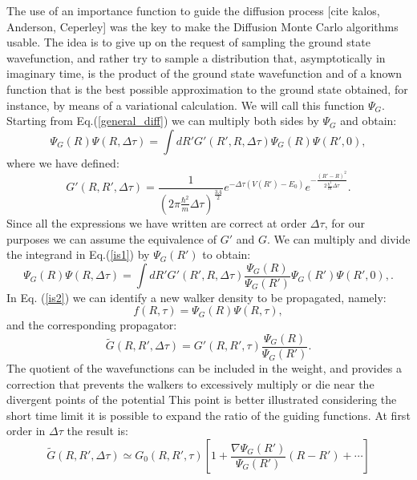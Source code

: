 The use of an importance function to guide the diffusion process [cite kalos, Anderson, Ceperley] was the key to make the Diffusion Monte Carlo algorithms usable. The idea is to give up on the request of sampling the ground state wavefunction, and rather try to sample a distribution that, asymptotically in imaginary time, is the product of the ground state wavefunction and of a known function that is the best possible approximation to the ground state obtained, for instance, by means of a variational calculation. We will call this function $\Psi_G$. Starting from Eq.(\ref{general_diff}) we can multiply both sides by $\Psi_G$ and obtain:
	\begin{equation}
	\Psi_G(R)\Psi(R,\Delta\tau)=\int dR' G'(R',R,\Delta\tau) \Psi_G(R)\Psi(R',0),\label{is1}
	\end{equation}
where we have defined:
\begin{equation}
G'(R,R',\Delta\tau)=\frac{1}{(2\pi\frac{\hbar^2}{m}\Delta\tau)^\frac{3A}{2}}e^{-\Delta\tau(V(R')-E_0)} e^{-\frac{(R'-R)^2}{2\frac{\hbar^2}{m}\Delta\tau}}.
\end{equation}
Since all the expressions we have written are correct at order $\Delta\tau$, for our purposes we can assume the equivalence of $G'$ and $G$. 
We can multiply and divide the  integrand in Eq.(\ref{is1}) by $\Psi_G(R')$ to obtain:
\begin{equation}
\Psi_G(R)\Psi(R,\Delta\tau)=\int dR' G'(R',R,\Delta\tau) \frac{\Psi_G(R)}{\Psi_G(R')}\Psi_G(R')\Psi(R',0),\label{is2}.
\end{equation}
In Eq. (\ref{is2}) we can identify a new walker density to be propagated, namely:
\begin{equation}
f(R,\tau)=\Psi_G(R)\Psi(R,\tau),
\end{equation}
and the corresponding propagator:
\begin{equation}
\tilde{G}(R,R',\Delta\tau)=G'(R,R',\tau)\frac{\Psi_G(R)}{\Psi_G(R')}.
\end{equation}
The quotient of the wavefunctions can be included in the weight, and provides a correction that prevents the walkers to excessively multiply or die near the divergent points of the potential
This point is better illustrated considering the short time limit it is possible to expand the ratio of the guiding functions. At first order in $\Delta\tau$ the result is:
\begin{equation}
\tilde{G}(R,R',\Delta\tau)\simeq G_0(R,R',\tau)\left[1+\frac{\nabla\Psi_G(R')}{\Psi_G(R')}(R-R')+\cdots\right]
\end{equation}
